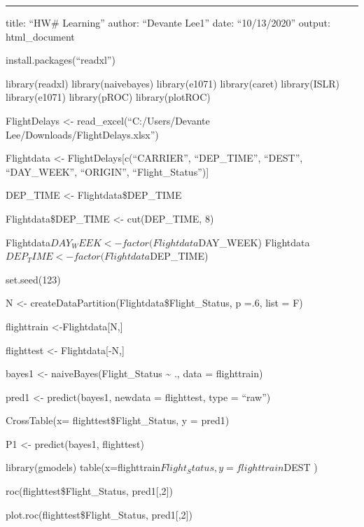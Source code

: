 \documentclass[
]{article}
\author{}
\date{\vspace{-2.5em}}
\begin{document}
\begin{center}\rule{0.5\linewidth}{0.5pt}\end{center}

title: ``HW\# Learning'' author: ``Devante Lee1'' date: ``10/13/2020''
output: html\_document

install.packages(``readxl'')

library(readxl) library(naivebayes) library(e1071) library(caret)
library(ISLR) library(e1071) library(pROC) library(plotROC)

FlightDelays \textless- read\_excel(``C:/Users/Devante
Lee/Downloads/FlightDelays.xlsx'')

Flightdata \textless- FlightDelays{[}c(``CARRIER'', ``DEP\_TIME'',
``DEST'', ``DAY\_WEEK'', ``ORIGIN'', ``Flight\_Status''){]}

DEP\_TIME \textless- Flightdata\$DEP\_TIME

Flightdata\$DEP\_TIME \textless- cut(DEP\_TIME, 8)

Flightdata\(DAY_WEEK <- factor(Flightdata\)DAY\_WEEK)
Flightdata\(DEP_TIME <- factor(Flightdata\)DEP\_TIME)

set.seed(123)

N \textless- createDataPartition(Flightdata\$Flight\_Status, p =.6, list
= F)

flighttrain \textless-Flightdata{[}N,{]}

flighttest \textless- Flightdata{[}-N,{]}

bayes1 \textless- naiveBayes(Flight\_Status \textasciitilde{} ., data =
flighttrain)

pred1 \textless- predict(bayes1, newdata = flighttest, type = ``raw'')

CrossTable(x= flighttest\$Flight\_Status, y = pred1)

P1 \textless- predict(bayes1, flighttest)

library(gmodels) table(x=flighttrain\(Flight_Status, y=flighttrain\)DEST
)

roc(flighttest\$Flight\_Status, pred1{[},2{]})

plot.roc(flighttest\$Flight\_Status, pred1{[},2{]})
\end{document}
